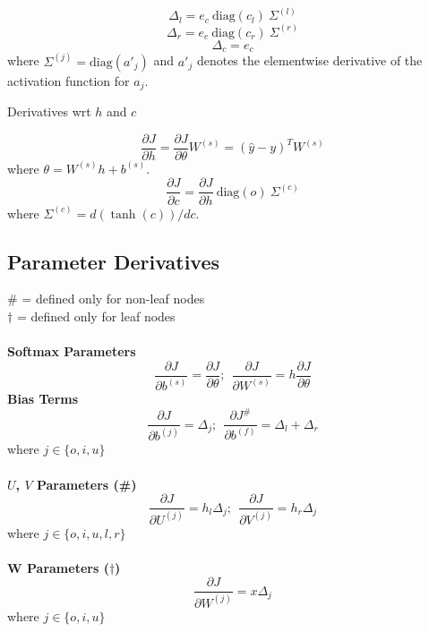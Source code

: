 \documentclass[12pt]{article}
\begin{document}
\begin{equation}
	\Delta_l = e_c \:\text{diag}(c_l)\:\Sigma^{(l)}
\end{equation}
\begin{equation}
	\Delta_r = e_c \:\text{diag}(c_r)\:\Sigma^{(r)}
\end{equation}
\begin{equation}
	\Delta_c = e_c
\end{equation}
where $\Sigma^{(j)} = \text{diag}(a'_j)$ and $a'_j$ denotes the elementwise derivative of the activation function for $a_j$.
\begin{description}
	\item [Derivatives wrt $h$ and $c$]
\end{description}
\begin{equation}
	\frac{\partial J}{\partial h} = \frac{\partial J}{\partial \theta} W^{(s)} = (\hat{y}-y)^T W^{(s)}
\end{equation}
where $\theta = W^{(s)}h+b^{(s)}$.
\begin{equation}
	\frac{\partial J}{\partial c} = \frac{\partial J}{\partial h} \:\text{diag}(o) \:\Sigma^{(c)}
\end{equation}
where $\Sigma^{(c)} = d(\tanh(c))/dc$.

\subsection{Parameter Derivatives}
\# = defined only for non-leaf nodes \\
$\dagger$ = defined only for leaf nodes \\\\
\textbf{Softmax Parameters}
\begin{equation}
	\frac{\partial J}{\partial b^{(s)}} = \frac{\partial J}{\partial \theta}; \:\:
	\frac{\partial J}{\partial W^{(s)}} = h \frac{\partial J}{\partial \theta}
\end{equation}
\textbf{Bias Terms}
\begin{equation}
	\frac{\partial J}{\partial b^{(j)}} = \Delta_j;\:\:
	\frac{\partial J^\#}{\partial b^{(f)}} = \Delta_l+\Delta_r
\end{equation}
where $j \in \{o, i, u\}$ \\\\
\textbf{$U$, $V$ Parameters (\#)}
\begin{equation}
	\frac{\partial J}{\partial U^{(j)}} = h_l \Delta_j; \:\:
	\frac{\partial J}{\partial V^{(j)}} = h_r \Delta_j
\end{equation}
where $j \in \{o, i, u, l, r\}$ \\\\
\textbf{W Parameters ($\dagger$)}
\begin{equation}
	\frac{\partial J}{\partial W^{(j)}} = x \Delta_j
\end{equation}
where $j \in \{o, i, u\}$
\end{document}
